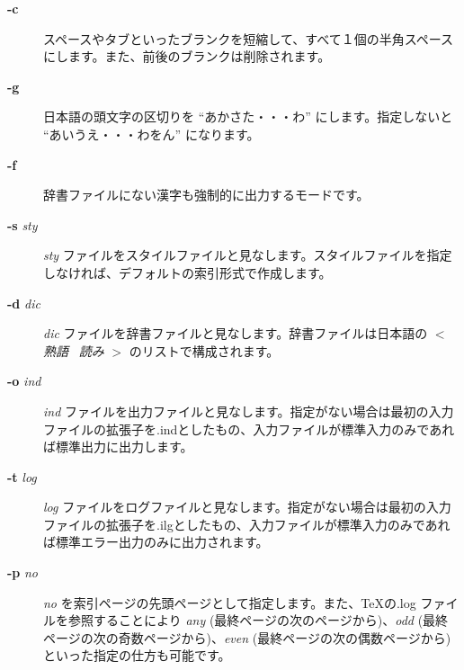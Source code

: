 \documentclass[10pt,dvipdfmx]{jsarticle}
\begin{document}
\begin{description}
\item[\textbf{-c}
] スペースやタブといったブランクを短縮して、すべて１個の半角スペースにします。また、前後のブランクは削除されます。

\end{description}
\begin{description}
\item[\textbf{-g}
] 日本語の頭文字の区切りを ``あかさた・・・わ'' にします。指定しないと ``あいうえ・・・わをん'' になります。

\end{description}
\begin{description}
\item[\textbf{-f}
] 辞書ファイルにない漢字も強制的に出力するモードです。

\end{description}
\begin{description}
\item[\textbf{-s}
\emph{ sty}
]\emph{sty}
 ファイルをスタイルファイルと見なします。スタイルファイルを指定しなければ、デフォルトの索引形式で作成します。

\end{description}
\begin{description}
\item[\textbf{-d}
\emph{ dic}
]\emph{dic}
 ファイルを辞書ファイルと見なします。辞書ファイルは日本語の $<$\emph{熟語}
 \emph{読み}
$>$ のリストで構成されます。

\end{description}
\begin{description}
\item[\textbf{-o}
\emph{ ind}
]\emph{ind}
 ファイルを出力ファイルと見なします。指定がない場合は最初の入力ファイルの拡張子を.indとしたもの、入力ファイルが標準入力のみであれば標準出力に出力します。

\end{description}
\begin{description}
\item[\textbf{-t}
\emph{ log}
]\emph{log}
 ファイルをログファイルと見なします。指定がない場合は最初の入力ファイルの拡張子を.ilgとしたもの、入力ファイルが標準入力のみであれば標準エラー出力のみに出力されます。

\end{description}
\begin{description}
\item[\textbf{-p}
\emph{ no}
]\emph{no}
 を索引ページの先頭ページとして指定します。また、TeXの.log ファイルを参照することにより \emph{any}
(最終ページの次のページから)、\emph{odd}
(最終ページの次の奇数ページから)、\emph{even}
(最終ページの次の偶数ページから)といった指定の仕方も可能です。

\end{description}
\end{document}
